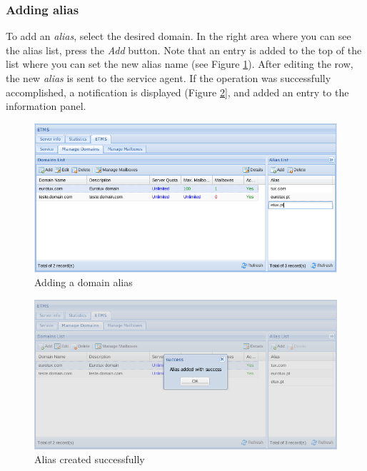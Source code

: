 \subsubsection{Adding alias}
\label{sec:etms_sub_criacao_alias_dominio}
To add an \textit{alias}, select the desired domain. In the right area where you can see the alias list, press the \textit{Add} button. Note that an entry is added to the top of the list where you can set the new alias name (see Figure \ref{fig:etms_criar_alias_dominio}). After editing the row, the new \textit{alias} is sent to the service agent. If the operation was successfully accomplished, a notification is displayed (Figure \ref{fig:etms_criar_alias_dominio_success}], and added an entry to the information panel.

\begin{figure}[H]
    \begin{center}
    \includegraphics[scale=0.45]{screenshots/etms/etms_criar_alias_dominio.png}
    \caption{Adding a domain alias}
    \label{fig:etms_criar_alias_dominio}
    \end{center}
\end{figure}

\begin{figure}[H]
    \begin{center}
    \includegraphics[scale=0.45]{screenshots/etms/etms_criar_alias_dominio_success.png}
    \caption{Alias created successfully}
    \label{fig:etms_criar_alias_dominio_success}
    \end{center}
\end{figure}


